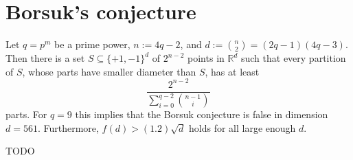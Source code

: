 \chapter{Borsuk's conjecture}

\begin{theorem}
  Let $q = p^m$ be a prime power, $n := 4q - 2$, and $d := \binom{n}{2} = (2q - 1)(4q - 3)$.
  Then there is a set $S \subseteq \{+1, -1\}^d$ of $2^{n-2}$ points in $\mathbb{R}^d$
  such that every partition of $S$, whose parts have smaller diameter than $S$, has at least
  \[
  \frac{2^{n-2}}{\sum_{i=0}^{q-2} \binom{n-1}{i}}
  \]
  parts. For $q = 9$ this implies that the Borsuk conjecture is false in dimension $d = 561$.
  Furthermore, $f(d) > (1.2)\sqrt{d}$ holds for all large enough $d$.
\end{theorem}
\begin{theorem}
  TODO
\end{theorem}
